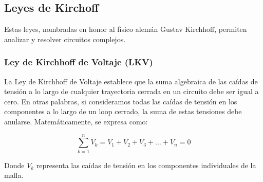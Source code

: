 \subsection{Leyes de Kirchoff}

Estas leyes, nombradas en honor al físico alemán Gustav Kirchhoff, permiten analizar y resolver circuitos complejos.

\subsubsection{Ley de Kirchhoff de Voltaje (LKV)}

La Ley de Kirchhoff de Voltaje establece que la suma algebraica de las caídas de tensión a lo largo de cualquier trayectoria cerrada en un circuito debe ser igual a cero. En otras palabras, si consideramos todas las caídas de tensión en los componentes a lo largo de un loop cerrado, la suma de estas tensiones debe anularse. Matemáticamente, se expresa como:

\begin {equation*}
    \sum_{k=1}^{n} V_k = V_1 + V_2 + V_3 + \ldots + V_n = 0
\end {equation*}

Donde \(V_k\) representa las caídas de tensión en los componentes individuales de la malla. 

          

